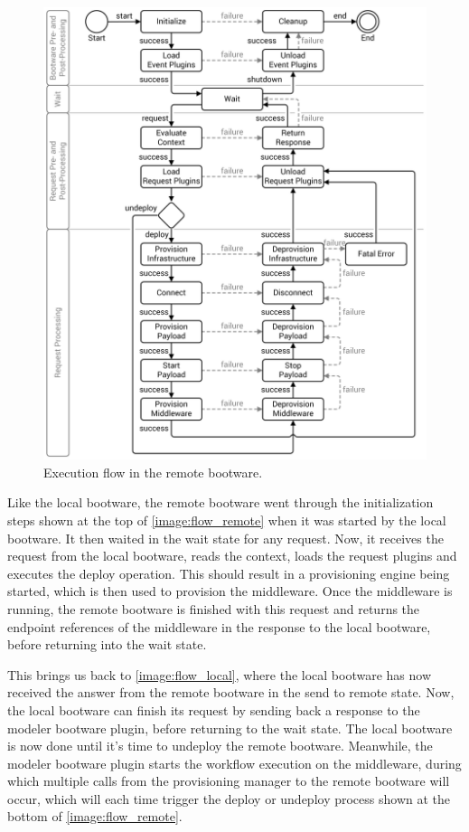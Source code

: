 \begin{figure}[!htbp]
	\centering
	\includegraphics[resolution=600]{design/assets/flow_remote}
	\caption{Execution flow in the remote bootware.}
	\label{image:flow_remote}
\end{figure}

Like the local bootware, the remote bootware went through the initialization steps shown at the top of \autoref{image:flow_remote} when it was started by the local bootware.
It then waited in the wait state for any request.
Now, it receives the request from the local bootware, reads the context, loads the request plugins and executes the deploy operation.
This should result in a provisioning engine being started, which is then used to provision the middleware.
Once the middleware is running, the remote bootware is finished with this request and returns the endpoint references of the middleware in the response to the local bootware, before returning into the wait state.

This brings us back to \autoref{image:flow_local}, where the local bootware has now received the answer from the remote bootware in the send to remote state.
Now, the local bootware can finish its request by sending back a response to the modeler bootware plugin, before returning to the wait state.
The local bootware is now done until it's time to undeploy the remote bootware.
Meanwhile, the modeler bootware plugin starts the workflow execution on the middleware, during which multiple calls from the provisioning manager to the remote bootware will occur, which will each time trigger the deploy or undeploy process shown at the bottom of \autoref{image:flow_remote}.

